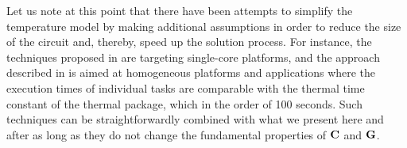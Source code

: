 Let us note at this point that there have been attempts to simplify the
temperature model by making additional assumptions in order to reduce the size
of the circuit and, thereby, speed up the solution process. For instance, the
techniques proposed in \cite{bao2010, rai2011} are targeting single-core
platforms, and the approach described in \cite{rao2009} is aimed at homogeneous
platforms and applications where the execution times of individual tasks are
comparable with the thermal time constant of the thermal package, which in the
order of 100 seconds. Such techniques can be straightforwardly combined with
what we present here and after as long as they do not change the fundamental
properties of $\mathbf{C}$ and $\mathbf{G}$.
